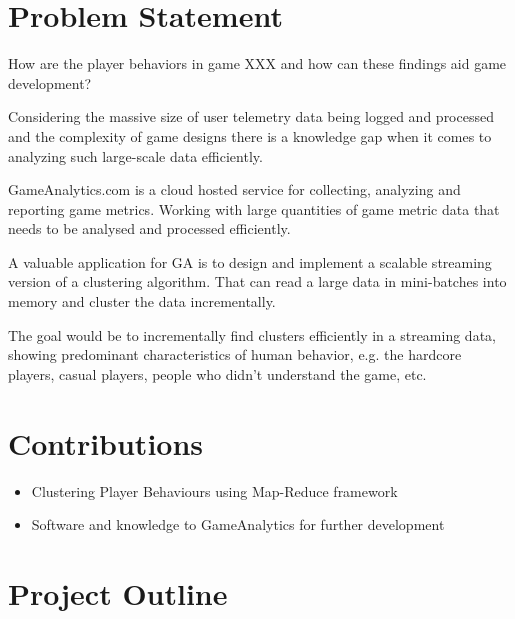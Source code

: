 \section{Problem Statement}
\begin{center}
How are the player behaviors in game XXX and how can these findings aid game development?
\end{center}

Considering the massive size of user telemetry data being logged and processed and the complexity of game designs there is a knowledge gap when it comes to analyzing such large-scale data efficiently.  

GameAnalytics.com is a cloud hosted service for collecting, analyzing and reporting game metrics. Working with large quantities of game metric data that needs to be analysed and processed efficiently. 

A valuable application for GA is to design and implement a scalable streaming version of a clustering algorithm. That can read a large data in mini-batches into memory and cluster the data incrementally. 

The goal would be to incrementally find clusters efficiently in a streaming data, showing predominant characteristics of human behavior, e.g. the hardcore players, casual players, people who didn't understand the game, etc.

\section{Contributions}
\begin{itemize}
\item Clustering Player Behaviours using Map-Reduce framework
\item Software and knowledge to GameAnalytics for further development
\end{itemize}

\section{Project Outline}


